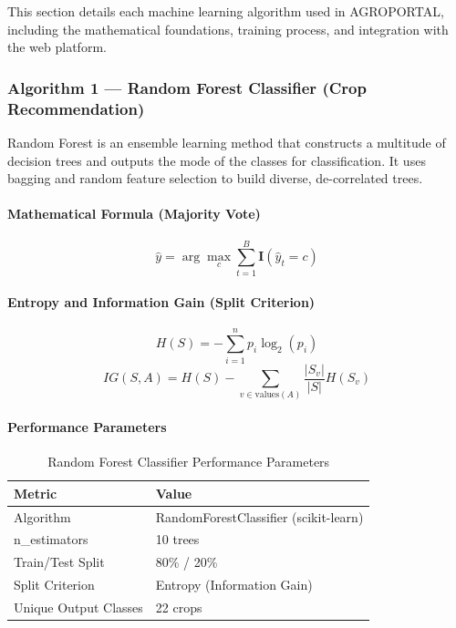 This section details each machine learning algorithm used in AGROPORTAL, including the mathematical foundations, training process, and integration with the web platform.

\subsubsection{Algorithm 1 --- Random Forest Classifier (Crop Recommendation)}

Random Forest is an ensemble learning method that constructs a multitude of decision trees and outputs the mode of the classes for classification. It uses bagging and random feature selection to build diverse, de-correlated trees.

\paragraph{Mathematical Formula (Majority Vote)}
\begin{equation}
\hat{y} = \arg\max_{c} \sum_{t=1}^{B} \mathbf{I}(\hat{y}_t = c)
\label{eq:rf_majority}
\end{equation}

\paragraph{Entropy and Information Gain (Split Criterion)}
\begin{equation}
H(S) = -\sum_{i=1}^{n} p_i \log_2(p_i)
\label{eq:entropy}
\end{equation}
\begin{equation}
IG(S, A) = H(S) - \sum_{v \in \text{values}(A)} \frac{|S_v|}{|S|} H(S_v)
\label{eq:infogain}
\end{equation}

\paragraph{Performance Parameters}
\begin{table}[ht]
\centering
\caption{Random Forest Classifier Performance Parameters}
\label{tab:rf_perf}
\begin{tabular}{|l|l|}
\hline
\textbf{Metric} & \textbf{Value} \\
\hline
Algorithm & RandomForestClassifier (scikit-learn) \\
n\_estimators & 10 trees \\
Train/Test Split & 80\% / 20\% \\
Split Criterion & Entropy (Information Gain) \\
Unique Output Classes & 22 crops \\
\hline
\end{tabular}
\end{table}

